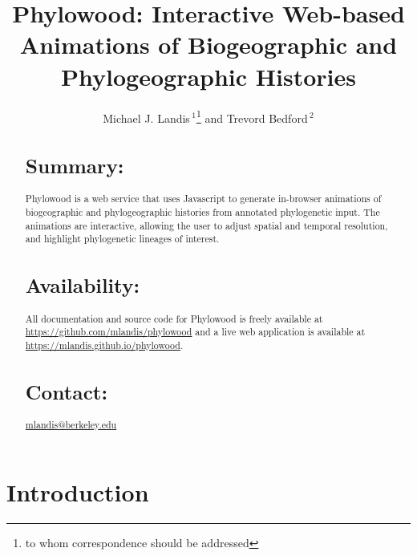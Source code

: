 \documentclass{bioinfo}
\begin{document}

\title[Phylowood: biogeographic animations]{Phylowood: Interactive Web-based Animations of Biogeographic and Phylogeographic Histories}
\author[Sample \textit{et~al}]{Michael J. Landis\,$^{1}$\footnote{to whom correspondence should be addressed} and Trevord Bedford\,$^2$}
\address{$^{1}$Department of Integrative Biology, UC Berkeley, Berkeley, California, USA\\
$^{2}$Institute of Evolution, University of Edinburgh, Edinburgh, UK}



\maketitle

\begin{abstract}

\section{Summary:} Phylowood is a web service that uses Javascript to generate in-browser animations of biogeographic and phylogeographic histories from annotated phylogenetic input. The animations are interactive, allowing the user to adjust spatial and temporal resolution, and highlight phylogenetic lineages of interest.

\section{Availability:} All documentation and source code for Phylowood is freely available at \href{https://github.com/mlandis/phylowood}{https://github.com/mlandis/phylowood} and a live web application is available at \href{https://mlandis.github.io/phylowood}{https://mlandis.github.io/phylowood}.

\section{Contact:} \href{mlandis@berkeley.edu}{mlandis@berkeley.edu}
\end{abstract}

\section{Introduction}
\end{document}
